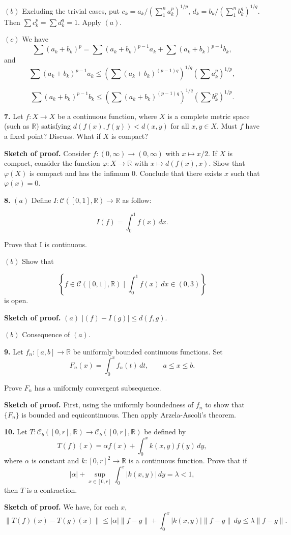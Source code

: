 \documentclass{article}
\begin{document}
$(b)$ Excluding the trivial cases, put
$c_k = a_k/\left(\sum_1^n a_k^p\right)^{1/p}$,
$d_k = b_k/\left(\sum_1^n b_k^q\right)^{1/q}$. Then
$\sum c_k^p = \sum d_k^q = 1$. Apply $(a)$.

$(c)$ We have
\[\sum(a_k+b_k)^p = \sum(a_k+b_k)^{p-1}a_k + \sum(a_k+b_k)^{p-1}b_k,\]
and
\[ \sum(a_k+b_k)^{p-1}a_k \le \left(\sum (a_k+b_k)^{(p-1)q}\right)^{1/q}(\sum a_k^p)^{1/p},\]

\[\sum(a_k+b_k)^{p-1}b_k \le \left(\sum (a_k+b_k)^{(p-1)q}\right)^{1/q}(\sum b_k^p)^{1/p}.\]

    \textbf{7.} Let $f:X\to X$ be a continuous function, where $X$ is a
complete metric space (such as $\mathbb{R}$) satisfying
$d(f(x), f(y)) < d(x, y)$ for all $x, y\in X$. Must $f$ have a fixed
point? Discuss. What if $X$ is compact?

\textbf{Sketch of proof.} Consider $f: (0,\infty)\to (0,\infty)$ with
$x\mapsto x/2$. If $X$ is compact, consider the function
$\varphi : X\to\mathbb{R}$ with $x\mapsto d(f(x),x)$. Show that
$\varphi(X)$ is compact and has the infimum $0$. Conclude that there
exists $x$ such that $\varphi(x) = 0$.

    \textbf{8.} $(a)$ Define
$I : \mathcal{C}([0,1], \mathbb{R}) \to \mathbb{R}$ as follow:

\[I(f) =\int_0^1 f(x)\,dx.\]

Prove that I is continuous.

$(b)$ Show that

\[\left\{ f\in\mathcal{C}([0,1], \mathbb{R}) \mid \int_0^1 f(x) \, dx \in (0,3)\right\} \]
is open.

\textbf{Sketch of proof.} $(a)$ $|(f) - I(g)| \le d(f,g)$.

$(b)$ Consequence of $(a)$.

    \textbf{9.} Let $f_n:[a,b]\to \mathbb{R}$ be uniformly bounded
continuous functions. Set
\[F_n(x) = \int_0^x f_n(t)\,dt,\qquad a\le x \le b.\]

Prove $F_n$ has a uniformly convergent subsequence.

\textbf{Sketch of proof.} First, using the uniformly boundedness of
$f_n$ to show that $\{F_n\}$ is bounded and equicontinuous. Then apply
Arzela-Ascoli's theorem.

    \textbf{10.} Let
$T : \mathcal{C}_b([0, r], \mathbb{R}) \to \mathcal{C}_b([0, r], \mathbb{R})$
be defined by \[ T(f)(x) = \alpha f(x) +\int_0^x k(x,y)f(y)\,dy,\] where
$\alpha$ is constant and $k : [0, r]^2 \to\mathbb{R}$ is a continuous
function. Prove that if
\[ |\alpha|+\sup_{x\in [ 0, r]}\int_0^x |k(x,y)|\,dy = \lambda < 1,\]
then $T$ is a contraction.

\textbf{Sketch of proof.} We have, for each $x$,
\[\| T(f)(x)-T(g)(x)\| \le |\alpha| \|f-g\| + \int_0^x|k(x,y)|\|f-g\|\,dy \le \lambda \|f-g\|.\]


    
    
    
    
\end{document}
